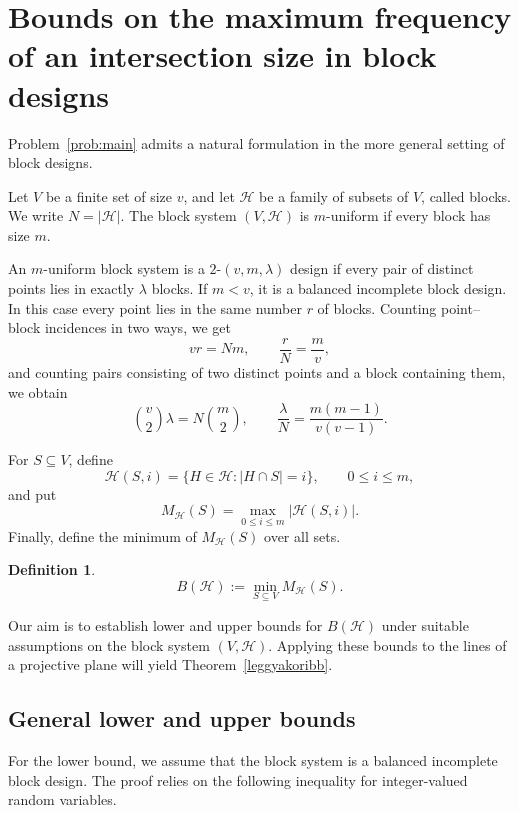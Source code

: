 \documentclass[10pt]{article}
\theoremstyle{definition}
\newtheorem{defi}[thm]{Definition}
\begin{document}
	
	
	
	
	
	\section[Bounds on the maximum frequency of an intersection size in block systems]{{Bounds on the maximum frequency of an intersection size in block designs}}
	\label{sec:general-block-systems}
	{Problem~\ref{prob:main} admits a natural formulation in the more general setting of block designs.}
	
	Let \(V\) be a finite set of size \(v\), and let \(\mathcal H\) be a family of subsets of \(V\), called blocks. We write \(N=|\mathcal H|\). The block system \((V,\mathcal H)\) is \(m\)-uniform if every block has size \(m\).
	
	An \(m\)-uniform block system is a \(2\text{-}(v,m,\lambda)\) design if every pair of distinct points lies in exactly \(\lambda\) blocks. If \(m<v\), it is a balanced incomplete block design. In this case every point lies in the same number \(r\) of blocks. Counting point--block incidences in two ways, we get
	\[
	vr=Nm,
	\qquad
	\frac{r}{N}=\frac{m}{v},
	\]
	and counting pairs consisting of two distinct points and a block containing them, we obtain
	\[
	\binom{v}{2}\lambda=N\binom{m}{2},
	\qquad
	\frac{\lambda}{N}=\frac{m(m-1)}{v(v-1)}.
	\]
	
	For \(S\subseteq V\), define
	\[
	\mathcal H(S,i)=\{H\in\mathcal H:|H\cap S|=i\},
	\qquad 0\leq i\leq m,
	\]
	and put \[M_{\mathcal H}(S)=\max_{0\leq i\leq m}|\mathcal H(S,i)|.\] Finally, define the minimum of $M_{\mathcal H}(S)$  over all sets.
	
	\begin{defi}
		\[B(\mathcal H):=\min_{S\subseteq V}M_{\mathcal H}(S).\]
	\end{defi}
	
	
	{Our aim is to establish lower and upper bounds for \(B(\mathcal H)\) under suitable assumptions on the block system \((V,\mathcal H)\). Applying these bounds to the lines of a projective plane will yield Theorem~\ref{leggyakoribb}.}
	
	\subsection[General lower and upper bounds]{{General lower and upper bounds}}
	For the lower bound, we assume that the block system is a balanced
	incomplete block design. The proof relies on the following inequality
	for integer-valued random variables. 
	
\end{document}
